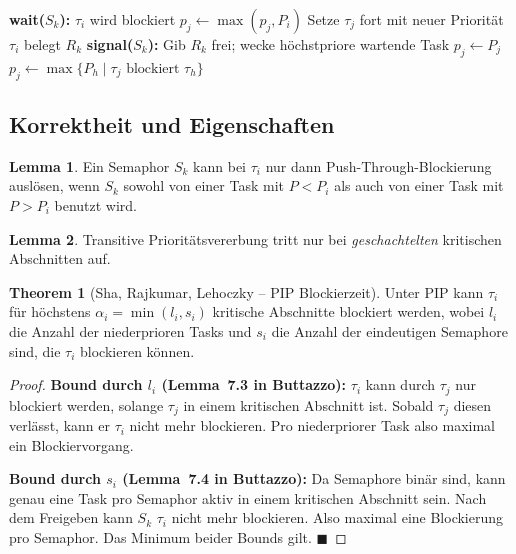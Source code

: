 ﻿\documentclass[a4paper,12pt]{report}
\theoremstyle{definition}
\newtheorem{lemma}{Lemma}[chapter]
\newtheorem{theorem}{Theorem}[chapter]
\begin{document}
\begin{algorithm}[H]
	\caption{Priority Inheritance Protocol (PIP)}
	\begin{algorithmic}[1]
		\State \textbf{wait($S_k$):}
		\State $\tau_i$ wird blockiert
		\State $p_j \leftarrow \max(p_j, P_i)$ 
		\State Setze $\tau_j$ fort mit neuer Priorität
		\Else
		\State $\tau_i$ belegt $R_k$
		\EndIf
		\State
		\State \textbf{signal($S_k$):}
		\State Gib $R_k$ frei; wecke höchstpriore wartende Task
		\State $p_j \leftarrow P_j$ 
		\Else
		\State $p_j \leftarrow \max\{P_h \mid \tau_j \text{ blockiert } \tau_h\}$
		\EndIf
	\end{algorithmic}
\end{algorithm}

\subsection{Korrektheit und Eigenschaften}

\begin{lemma}
	Ein Semaphor $S_k$ kann bei $\tau_i$ nur dann Push-Through-Blockierung
	auslösen, wenn $S_k$ sowohl von einer Task mit $P < P_i$ als auch von einer
	Task mit $P > P_i$ benutzt wird.
\end{lemma}

\begin{lemma}
	Transitive Prioritätsvererbung tritt nur bei \emph{geschachtelten}
	kritischen Abschnitten auf.
\end{lemma}

\begin{theorem}[Sha, Rajkumar, Lehoczky -- PIP Blockierzeit]
	\label{thm:pip}
	Unter PIP kann $\tau_i$ für höchstens $\alpha_i = \min(l_i, s_i)$ kritische
	Abschnitte blockiert werden, wobei $l_i$ die Anzahl der niederprioren Tasks
	und $s_i$ die Anzahl der eindeutigen Semaphore sind, die $\tau_i$ blockieren
	können.
\end{theorem}

\begin{proof}
	\textbf{Bound durch $l_i$ (Lemma~7.3 in Buttazzo):} $\tau_i$ kann durch
	$\tau_j$ nur blockiert werden, solange $\tau_j$ in einem kritischen Abschnitt
	ist. Sobald $\tau_j$ diesen verlässt, kann er $\tau_i$ nicht mehr blockieren.
	Pro niederpriorer Task also maximal ein Blockiervorgang.

	\textbf{Bound durch $s_i$ (Lemma~7.4 in Buttazzo):} Da Semaphore binär sind,
	kann genau eine Task pro Semaphor aktiv in einem kritischen Abschnitt sein.
	Nach dem Freigeben kann $S_k$ $\tau_i$ nicht mehr blockieren. Also maximal
	eine Blockierung pro Semaphor. Das Minimum beider Bounds gilt. \hfill$\blacksquare$
\end{proof}
\end{document}
